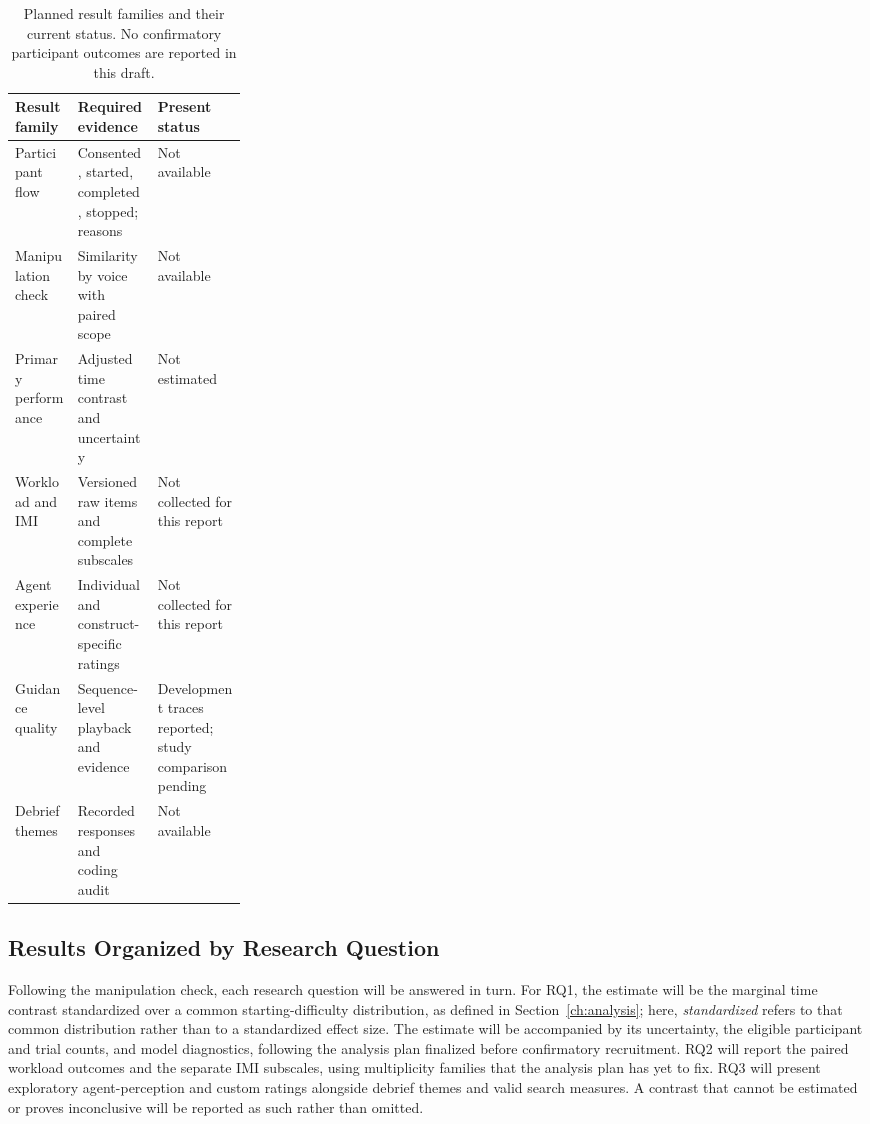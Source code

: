 \begin{table}[htbp]
\centering\caption{Planned result families and their current status. No confirmatory participant outcomes are reported in this draft.}
\small{}
\begin{tabularx}{\linewidth}{@{}p{0.27\linewidth}XX@{}}\toprule
Result family & Required evidence & Present status \\\midrule
Participant flow & Consented, started, completed, stopped; reasons & Not available \\
Manipulation check & Similarity by voice with paired scope & Not available \\
Primary performance & Adjusted time contrast and uncertainty & Not estimated \\
Workload and IMI & Versioned raw items and complete subscales & Not collected for this report \\
Agent experience & Individual and construct-specific ratings & Not collected for this report \\
Guidance quality & Sequence-level playback and evidence & Development traces reported; study comparison pending \\
Debrief themes & Recorded responses and coding audit & Not available \\\bottomrule
\end{tabularx}
\end{table}


\subsection{Results Organized by Research Question}
Following the manipulation check, each research question will be answered in turn. For RQ1, the estimate will be the marginal time contrast standardized over a common starting-difficulty distribution, as defined in Section~\ref{ch:analysis}; here, \emph{standardized} refers to that common distribution rather than to a standardized effect size. The estimate will be accompanied by its uncertainty, the eligible participant and trial counts, and model diagnostics, following the analysis plan finalized before confirmatory recruitment. RQ2 will report the paired workload outcomes and the separate IMI subscales, using multiplicity families that the analysis plan has yet to fix. RQ3 will present exploratory agent-perception and custom ratings alongside debrief themes and valid search measures. A contrast that cannot be estimated or proves inconclusive will be reported as such rather than omitted.


